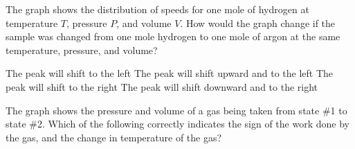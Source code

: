 \documentclass{../../../oss-ap12ibhl-print}
\begin{document}
\begin{questions}
%
%  
%    
    
  \question The graph shows the distribution of speeds for one mole of hydrogen
  at temperature $T$, pressure $P$, and volume $V$. How would the graph change
  if the sample was changed from one mole hydrogen to one mole of argon at the
  same temperature, pressure, and volume?

  \begin{minipage}{.37\textwidth}
  \end{minipage}
  \begin{minipage}{.6\textwidth}
    \begin{choices}
      \choice The peak will shift to the left
      \choice The peak will shift upward and to the left
      \choice The peak will shift to the right
      \choice The peak will shift downward and to the right
    \end{choices}
  \end{minipage}
  \vspace{.3in}
  
  \question The graph shows the pressure and volume of a gas being taken from
  state \#1 to state \#2. Which of the following correctly indicates the sign of
  the work done by the gas, and the change in temperature of the gas?


\end{questions}
\end{document}
